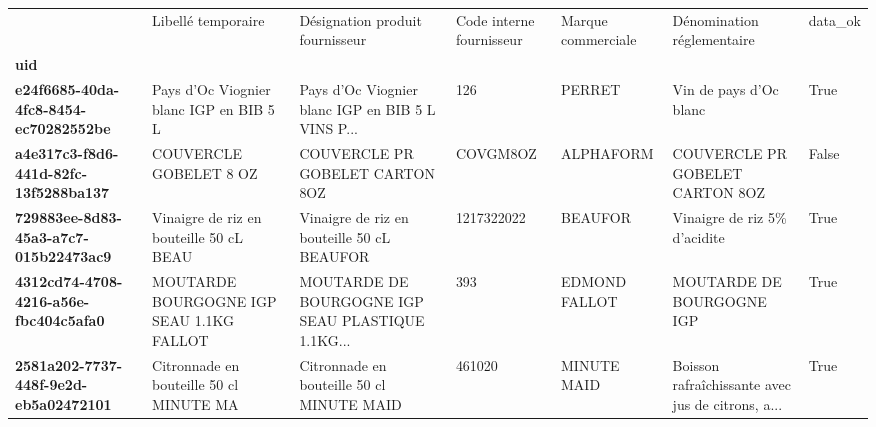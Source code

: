 \begin{tabularx}{\linewidth}{lXXXXXX}
\toprule
{} &                        Libellé temporaire &                    Désignation produit fournisseur & Code interne fournisseur & Marque commerciale &                         Dénomination réglementaire &  data\_ok \\
\textbf{uid                                 } &                                           &                                                    &                          &                    &                                                    &          \\
\midrule
\textbf{e24f6685-40da-4fc8-8454-ec70282552be} &   Pays d'Oc Viognier blanc IGP en BIB 5 L &  Pays d'Oc Viognier blanc IGP en BIB 5 L VINS P... &                      126 &             PERRET &                             Vin de pays d'Oc blanc &     True \\
\textbf{a4e317c3-f8d6-441d-82fc-13f5288ba137} &                    COUVERCLE GOBELET 8 OZ &                    COUVERCLE PR GOBELET CARTON 8OZ &                 COVGM8OZ &          ALPHAFORM &                    COUVERCLE PR GOBELET CARTON 8OZ &    False \\
\textbf{729883ee-8d83-45a3-a7c7-015b22473ac9} &   Vinaigre de riz en bouteille 50 cL BEAU &         Vinaigre de riz en bouteille 50 cL BEAUFOR &               1217322022 &            BEAUFOR &                       Vinaigre de riz 5\% d'acidite &     True \\
\textbf{4312cd74-4708-4216-a56e-fbc404c5afa0} &  MOUTARDE BOURGOGNE IGP SEAU 1.1KG FALLOT &  MOUTARDE DE BOURGOGNE IGP SEAU PLASTIQUE 1.1KG... &                      393 &      EDMOND FALLOT &                          MOUTARDE DE BOURGOGNE IGP &     True \\
\textbf{2581a202-7737-448f-9e2d-eb5a02472101} &   Citronnade en bouteille 50 cl MINUTE MA &          Citronnade en bouteille 50 cl MINUTE MAID &                   461020 &        MINUTE MAID &  Boisson rafraîchissante avec jus de citrons, a... &     True \\
\bottomrule
\end{tabularx}
